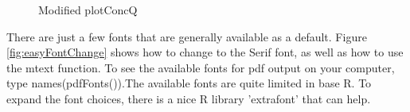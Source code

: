 \documentclass[a4paper,11pt]{article}\usepackage[]{graphicx}\usepackage[]{color}
\newenvironment{knitrout}{}{} %
\begin{document}
\begin{knitrout}
\begin{figure}[]
\caption[Modified plotConcQ]{Modified plotConcQ\label{fig:plotConcQComparison}}
\end{figure}


\end{knitrout}


There are just a few fonts that are generally available as a default. Figure \ref{fig:easyFontChange} shows how to change to the Serif font, as well as how to use the mtext function. To see the available fonts for pdf output on your computer, type names(pdfFonts()).The available fonts are quite limited in base R. To expand the font choices, there is a nice R library 'extrafont' that can help.
\end{document}

